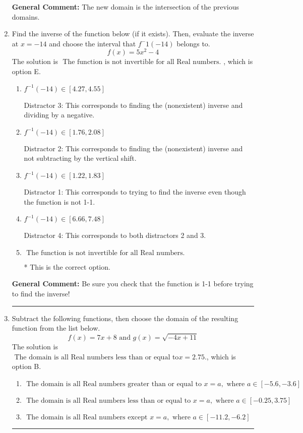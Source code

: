 \documentclass{extbook}[14pt]
\newcommand{\litem}[1]{\item #1

\rule{\textwidth}{0.4pt}}
\begin{document}
\begin{enumerate}
{\begin{enumerate}[label=\Alph*.]
\end{enumerate}

\textbf{General Comment:} The new domain is the intersection of the previous domains.
}
\litem{
Find the inverse of the function below (if it exists). Then, evaluate the inverse at $x = -14$ and choose the interval that $f^-1(-14)$ belongs to.
\[ f(x) = 5 x^2 - 4 \]The solution is \( \text{ The function is not invertible for all Real numbers. } \), which is option E.\begin{enumerate}[label=\Alph*.]
\item \( f^{-1}(-14) \in [4.27, 4.55] \)

 Distractor 3: This corresponds to finding the (nonexistent) inverse and dividing by a negative.
\item \( f^{-1}(-14) \in [1.76, 2.08] \)

 Distractor 2: This corresponds to finding the (nonexistent) inverse and not subtracting by the vertical shift.
\item \( f^{-1}(-14) \in [1.22, 1.83] \)

 Distractor 1: This corresponds to trying to find the inverse even though the function is not 1-1. 
\item \( f^{-1}(-14) \in [6.66, 7.48] \)

 Distractor 4: This corresponds to both distractors 2 and 3.
\item \( \text{ The function is not invertible for all Real numbers. } \)

* This is the correct option.
\end{enumerate}

\textbf{General Comment:} Be sure you check that the function is 1-1 before trying to find the inverse!
}
\litem{
Subtract the following functions, then choose the domain of the resulting function from the list below.
\[ f(x) = 7x + 8 \text{ and } g(x) = \sqrt{-4x+11}  \]The solution is \( \text{ The domain is all Real numbers less than or equal to} x = 2.75. \), which is option B.\begin{enumerate}[label=\Alph*.]
\item \( \text{ The domain is all Real numbers greater than or equal to } x = a, \text{ where } a \in [-5.6, -3.6] \)


\item \( \text{ The domain is all Real numbers less than or equal to } x = a, \text{ where } a \in [-0.25, 3.75] \)


\item \( \text{ The domain is all Real numbers except } x = a, \text{ where } a \in [-11.2, -6.2] \)



\end{enumerate}}
\end{enumerate}
\end{document}
